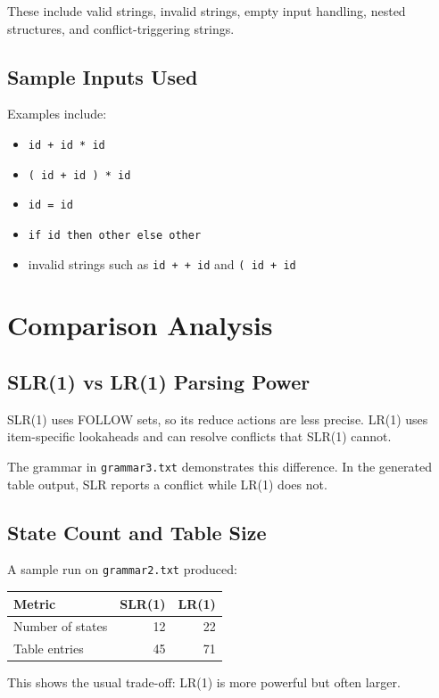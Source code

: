 \documentclass[12pt]{article}
\begin{document}
These include valid strings, invalid strings, empty input handling, nested structures, and conflict-triggering strings.

\subsection{Sample Inputs Used}
Examples include:
\begin{itemize}[leftmargin=1.5em]
    \item \texttt{id + id * id}
    \item \texttt{( id + id ) * id}
    \item \texttt{id = id}
    \item \texttt{if id then other else other}
    \item invalid strings such as \texttt{id + + id} and \texttt{( id + id}
\end{itemize}

\section{Comparison Analysis}

\subsection{SLR(1) vs LR(1) Parsing Power}
SLR(1) uses FOLLOW sets, so its reduce actions are less precise. LR(1) uses item-specific lookaheads and can resolve conflicts that SLR(1) cannot.

The grammar in \texttt{grammar3.txt} demonstrates this difference. In the generated table output, SLR reports a conflict while LR(1) does not.

\subsection{State Count and Table Size}
A sample run on \texttt{grammar2.txt} produced:

\begin{center}
\begin{tabular}{lrr}
\toprule
\textbf{Metric} & \textbf{SLR(1)} & \textbf{LR(1)} \\
\midrule
Number of states & 12 & 22 \\
Table entries & 45 & 71 \\
\bottomrule
\end{tabular}
\end{center}

This shows the usual trade-off: LR(1) is more powerful but often larger.
\end{document}
